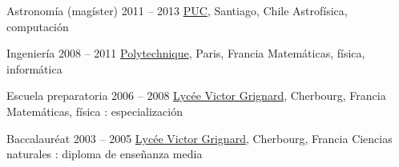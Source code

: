 



\begin{coordinatelist}
\end{coordinatelist}




\begin{yearlist}[7.1][0.7][3.5]

\item[Astronomía (magíster)]{2011 -- 2013}
	{
	\href{http://www.uc.cl/}{PUC}, Santiago, Chile
	}
    {Astrofísica, computación}
    

\item[Ingeniería]{2008 -- 2011}
	{
	\href{https://www.polytechnique.edu/}{Polytechnique}, Paris, Francia
	}
    {Matemáticas, física, informática}


\item[Escuela preparatoria]{2006 -- 2008}
	{
	\href{http://www.lycee-grignard.fr/}{Lyc\'ee Victor Grignard}, Cherbourg, Francia
	}
	{Matemáticas, física : especialización}


\item[Baccalaur\'eat]{2003 -- 2005}
	{
	\href{http://www.lycee-grignard.fr/}{Lyc\'ee Victor Grignard}, Cherbourg, Francia
	}
  {Ciencias naturales : diploma de enseñanza media}
    
\end{yearlist}


